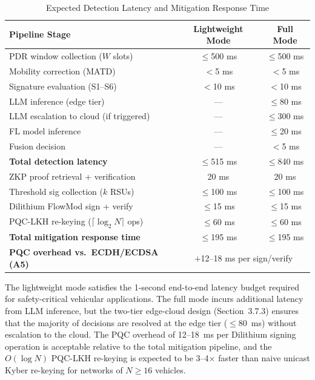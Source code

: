 \documentclass[12pt, a4paper]{report}
\begin{document}
\begin{table}[htbp]
\renewcommand{\arraystretch}{1.3}
\caption{Expected Detection Latency and Mitigation Response Time}
\label{tab:latency}
\centering
\scriptsize
\begin{tabular}{|l|c|c|}
\hline
\textbf{Pipeline Stage} & \textbf{Lightweight Mode} & \textbf{Full Mode} \\
\hline
PDR window collection ($W$ slots)        & $\leq$500 ms  & $\leq$500 ms   \\
Mobility correction (MATD)               & $<$5 ms       & $<$5 ms        \\
Signature evaluation (S1--S6)            & $<$10 ms      & $<$10 ms       \\
LLM inference (edge tier)                & ---           & $\leq$80 ms    \\
LLM escalation to cloud (if triggered)   & ---           & $\leq$300 ms   \\
FL model inference                       & ---           & $\leq$20 ms    \\
Fusion decision                          & ---           & $<$5 ms        \\
\hline
\textbf{Total detection latency}         & $\leq$515 ms  & $\leq$840 ms   \\
\hline
ZKP proof retrieval + verification       & 20 ms         & 20 ms          \\
Threshold sig collection ($k$ RSUs)      & $\leq$100 ms  & $\leq$100 ms   \\
Dilithium FlowMod sign + verify          & $\leq$15 ms   & $\leq$15 ms    \\
PQC-LKH re-keying ($\lceil\log_2 N\rceil$ ops) & $\leq$60 ms & $\leq$60 ms \\
\hline
\textbf{Total mitigation response time}  & $\leq$195 ms  & $\leq$195 ms   \\
\hline
\textbf{PQC overhead vs.\ ECDH/ECDSA (A5)} & \multicolumn{2}{c|}{$+$12--18 ms per sign/verify} \\
\hline
\end{tabular}
\end{table}

The lightweight mode satisfies the 1-second end-to-end latency budget required
for safety-critical vehicular applications. The full mode incurs additional
latency from LLM inference, but the two-tier edge-cloud design (Section~3.7.3)
ensures that the majority of decisions are resolved at the edge tier
($\leq$80~ms) without escalation to the cloud. The PQC overhead of 12--18~ms
per Dilithium signing operation is acceptable relative to the total mitigation
pipeline, and the $O(\log N)$ PQC-LKH re-keying is expected to be 3--4$\times$
faster than naive unicast Kyber re-keying for networks of $N \geq 16$ vehicles.
\end{document}
